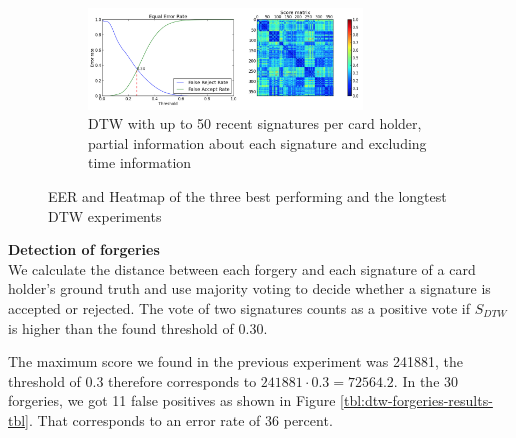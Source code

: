 \documentclass[a4paper, oneside]{csthesis}
\begin{document}
\begin{figure}
        \begin{subfigure}[b]{\textwidth}
                \centering
                \includegraphics[width=0.8\textwidth]{figures/dtw-exp4.png}
                \caption{DTW with up to 50 recent signatures per card holder, partial information about each signature and excluding time information}
                \label{fig:dtw-exp3}
        \end{subfigure}%

        \caption{EER and Heatmap of the three best performing and the longtest DTW experiments}\label{fig:dtw-experiments2}
\end{figure}

\noindent\textbf{Detection of forgeries}\\
We calculate the distance between each forgery and each signature of a card holder's ground truth and use majority voting to decide whether a signature is accepted or rejected. The vote of two signatures counts as a positive vote if $S_{DTW}$ is higher than the found threshold of 0.30.

The maximum score we found in the previous experiment was 241881, the threshold of 0.3 therefore corresponds to $241881 \cdot 0.3 = 72564.2$.
In the 30 forgeries, we got 11 false positives as shown in Figure \ref{tbl:dtw-forgeries-results-tbl}. That corresponds to an error rate of 36 percent.
\end{document}
